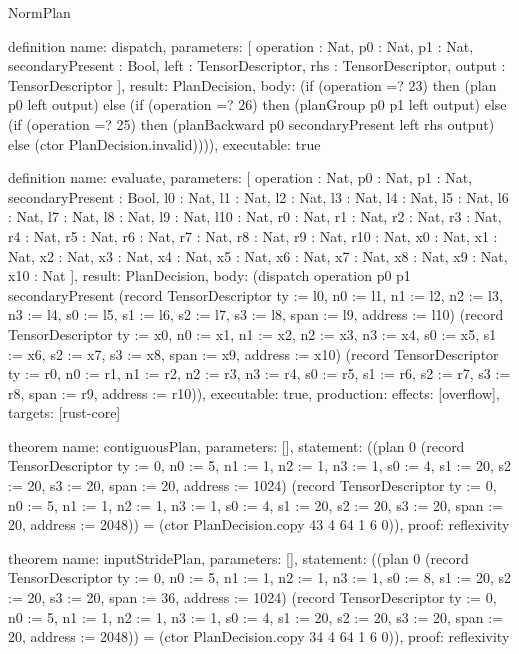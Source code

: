 \begin{lexlean}{NormPlan}
\begin{semanticmodule}
definition{
  name: dispatch,
  parameters: [
    operation : Nat,
    p0 : Nat,
    p1 : Nat,
    secondaryPresent : Bool,
    left : TensorDescriptor,
    rhs : TensorDescriptor,
    output : TensorDescriptor
  ],
  result: PlanDecision,
  body: (if (operation =? 23) then (plan p0 left output) else (if (operation =? 26) then (planGroup p0 p1 left output) else (if (operation =? 25) then (planBackward p0 secondaryPresent left rhs output) else (ctor PlanDecision.invalid)))),
  executable: true
}

definition{
  name: evaluate,
  parameters: [
    operation : Nat,
    p0 : Nat,
    p1 : Nat,
    secondaryPresent : Bool,
    l0 : Nat,
    l1 : Nat,
    l2 : Nat,
    l3 : Nat,
    l4 : Nat,
    l5 : Nat,
    l6 : Nat,
    l7 : Nat,
    l8 : Nat,
    l9 : Nat,
    l10 : Nat,
    r0 : Nat,
    r1 : Nat,
    r2 : Nat,
    r3 : Nat,
    r4 : Nat,
    r5 : Nat,
    r6 : Nat,
    r7 : Nat,
    r8 : Nat,
    r9 : Nat,
    r10 : Nat,
    x0 : Nat,
    x1 : Nat,
    x2 : Nat,
    x3 : Nat,
    x4 : Nat,
    x5 : Nat,
    x6 : Nat,
    x7 : Nat,
    x8 : Nat,
    x9 : Nat,
    x10 : Nat
  ],
  result: PlanDecision,
  body: (dispatch operation p0 p1 secondaryPresent (record TensorDescriptor {ty := l0, n0 := l1, n1 := l2, n2 := l3, n3 := l4, s0 := l5, s1 := l6, s2 := l7, s3 := l8, span := l9, address := l10}) (record TensorDescriptor {ty := x0, n0 := x1, n1 := x2, n2 := x3, n3 := x4, s0 := x5, s1 := x6, s2 := x7, s3 := x8, span := x9, address := x10}) (record TensorDescriptor {ty := r0, n0 := r1, n1 := r2, n2 := r3, n3 := r4, s0 := r5, s1 := r6, s2 := r7, s3 := r8, span := r9, address := r10})),
  executable: true,
  production: {effects: [overflow], targets: [rust-core]}
}

theorem{
  name: contiguousPlan,
  parameters: [],
  statement: ((plan 0 (record TensorDescriptor {ty := 0, n0 := 5, n1 := 1, n2 := 1, n3 := 1, s0 := 4, s1 := 20, s2 := 20, s3 := 20, span := 20, address := 1024}) (record TensorDescriptor {ty := 0, n0 := 5, n1 := 1, n2 := 1, n3 := 1, s0 := 4, s1 := 20, s2 := 20, s3 := 20, span := 20, address := 2048})) = (ctor PlanDecision.copy 43 4 64 1 6 0)),
  proof: reflexivity{}
}

theorem{
  name: inputStridePlan,
  parameters: [],
  statement: ((plan 0 (record TensorDescriptor {ty := 0, n0 := 5, n1 := 1, n2 := 1, n3 := 1, s0 := 8, s1 := 20, s2 := 20, s3 := 20, span := 36, address := 1024}) (record TensorDescriptor {ty := 0, n0 := 5, n1 := 1, n2 := 1, n3 := 1, s0 := 4, s1 := 20, s2 := 20, s3 := 20, span := 20, address := 2048})) = (ctor PlanDecision.copy 34 4 64 1 6 0)),
  proof: reflexivity{}
}


\end{semanticmodule}
\end{lexlean}
